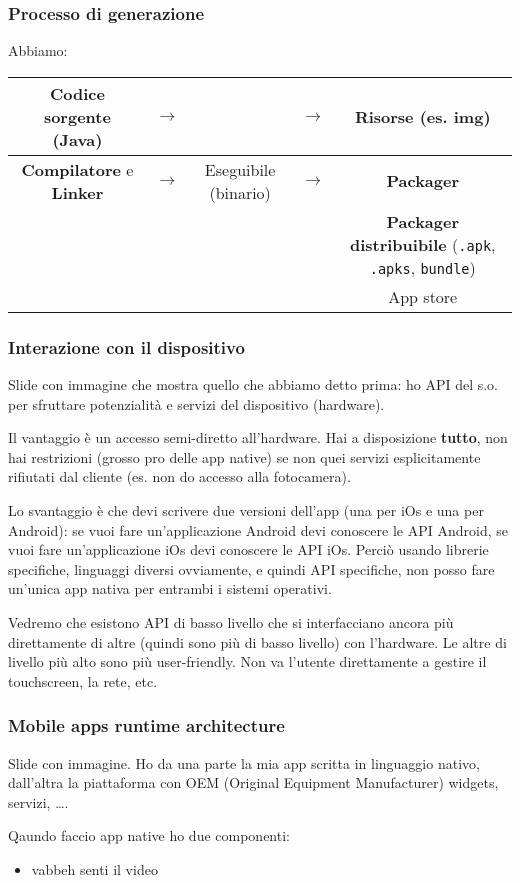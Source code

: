 \subsubsection{Processo di generazione}
\par Abbiamo: 
\begin{center}
    \begin{tabular}{ |c c c c c| }
        \hline
        \textbf{Codice sorgente} (Java) & $\rightarrow$ & & $\rightarrow$ & Risorse (es. img) \\
        \hline
        \textbf{Compilatore} e \textbf{Linker} & $\rightarrow$ & Eseguibile (binario) & $\rightarrow$ & \textbf{Packager} \\
        \hline
        & & & & \textbf{Packager distribuibile} (\texttt{.apk}, \texttt{.apks}, \texttt{bundle}) \\
        \hline
        & & & & App store\\
        \hline
    \end{tabular}
\end{center}

\subsubsection{Interazione con il dispositivo}
\par Slide con immagine che mostra quello che abbiamo detto prima: ho API del s.o. per sfruttare potenzialità e servizi del dispositivo (hardware).
\par Il vantaggio è un accesso semi-diretto all'hardware. Hai a disposizione \textbf{tutto}, non hai restrizioni (grosso pro delle app native) se non quei servizi esplicitamente rifiutati dal cliente (es. non do accesso alla fotocamera).
\par Lo svantaggio è che devi scrivere due versioni dell'app (una per iOs e una per Android): se vuoi fare un'applicazione Android devi conoscere le API Android, se vuoi fare un'applicazione iOs devi conoscere le API iOs. Perciò usando librerie specifiche, linguaggi diversi ovviamente, e quindi API specifiche, non posso fare un'unica app nativa per entrambi i sistemi operativi.
\par Vedremo che esistono API di basso livello che si interfacciano ancora più direttamente di altre (quindi sono più di basso livello) con l'hardware. Le altre di livello più alto sono più user-friendly. Non va l'utente direttamente a gestire il touchscreen, la rete, etc. 

\subsubsection{Mobile apps runtime architecture}
\par Slide con immagine. Ho da una parte la mia app scritta in linguaggio nativo, dall'altra la piattaforma con OEM (Original Equipment Manufacturer) widgets, servizi, \dots.
\par Qaundo faccio app native ho due componenti:
\begin{itemize}
    \item vabbeh senti il video
\end{itemize}

